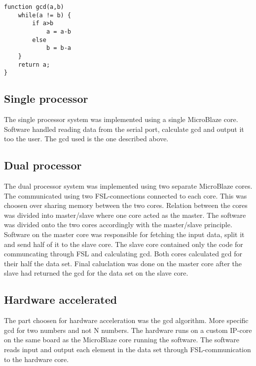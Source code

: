 \documentclass[11pt]{article}
\begin{document}
\begin{lstlisting}[float=tbh,frame=tb,captionpos=b,caption={Euclidean subtracion algorithm},label=lst:example]
function gcd(a,b)
	while(a != b) {
		if a>b
			a = a-b
		else
			b = b-a
	}
	return a;
}
\end{lstlisting}

\subsection{Single processor}
The single processor system was implemented using a single MicroBlaze core. Software handled reading data from the serial port, calculate gcd and output it too the user. The gcd used is the one described above.

\subsection{Dual processor}
The dual processor system was implemented using two separate MicroBlaze cores. The communicated using two FSL-connections connected to each core. This was choosen over sharing memory between the two cores. Relation between the cores was divided into master/slave where one core acted as the master. The software was divided onto the two cores accordingly with the master/slave principle. Software on the master core was responsible for fetching the input data, split it and send half of it to the slave core. The slave core contained only the code for communcating through FSL and calculating gcd. Both cores calculated gcd for their half the data set. Final caluclation was done on the master core after the slave had returned the gcd for the data set on the slave core.
\subsection{Hardware accelerated}
The part choosen for hardware acceleration was the gcd algorithm. More specific gcd for two numbers and not N numbers. The hardware runs on a custom IP-core on the same board as the MicroBlaze core running the software. The software reads input and output each element in the data set through FSL-communication to the hardware core.  

\end{document}
